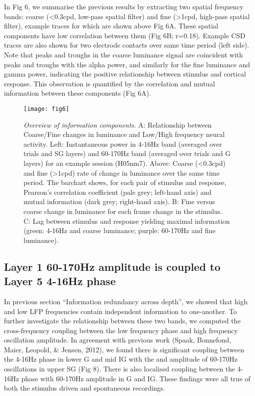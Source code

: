 In Fig 6, we summarise the previous results by extracting two spatial frequency bands: coarse ({\textless}0.3cpd, low-pass spatial filter) and fine ({\textgreater}1cpd, high-pass spatial filter), example traces for which are shown above Fig 6A. These spatial components have low correlation between them (Fig 6B; r=0.18). Example CSD traces are also shown for two electrode contacts over same time period (left side). Note that peaks and troughs in the coarse luminance signal are coincident with peaks and troughs with the alpha power, and similarly for the fine luminance and gamma power, indicating the positive relationship between stimulus and cortical response. This observation is quantified by the correlation and mutual information between these components (Fig 6A).

\begin{figure}[htbp]
\centering \texttt{[image: fig6]}
%
\caption{%
\textit{Overview of information components.}
A: Relationship between Coarse/Fine changes in luminance and Low/High frequency neural activity.
Left: Instantaneous power in 4-16Hz band (averaged over trials and SG layers) and 60-170Hz band (averaged over trials and G layers) for an example session (H05nm7).
Above: Coarse (<0.3cpd) and fine (>1cpd) rate of change in luminance over the same time period.
The barchart shows, for each pair of stimulus and response, Pearson's correlation coefficient (pale grey; left-hand axis) and mutual information (dark grey; right-hand axis).
B: Fine versus coarse change in luminance for each frame change in the stimulus.
C: Lag between stimulus and response yielding maximal information (green: 4-16Hz and coarse luminance; purple: 60-170Hz and fine luminance).}%
\label{fig:lam_6}
%
\end{figure}

\subsection{Layer 1 60-170Hz amplitude is coupled to Layer 5 4-16Hz phase}
In previous section ``Information redundancy across depth'', we showed that high and low LFP frequencies contain independent information to one-another. To further investigate the relationship between these two bands, we computed the cross-frequency coupling between the low frequency phase and high frequency oscillation amplitude. In agreement with previous work (Spaak, Bonnefond, Maier, Leopold, \& Jensen, 2012), we found there is significant coupling between the 4-16Hz phase in lower G and mid IG with the and amplitude of 60-170Hz oscillations in upper SG (Fig 8). There is also localised coupling between the 4-16Hz phase with 60-170Hz amplitude in G and IG. These findings were all true of both the stimulus driven and spontaneous recordings.

